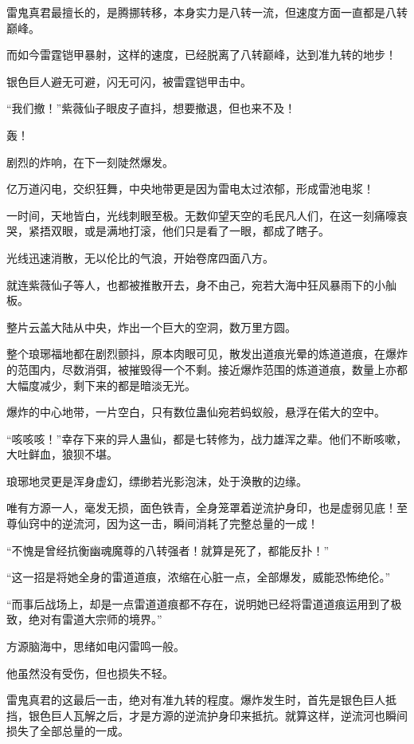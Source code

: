 \begin{this_body}
雷鬼真君最擅长的，是腾挪转移，本身实力是八转一流，但速度方面一直都是八转巅峰。

而如今雷霆铠甲暴射，这样的速度，已经脱离了八转巅峰，达到准九转的地步！

银色巨人避无可避，闪无可闪，被雷霆铠甲击中。

“我们撤！”紫薇仙子眼皮子直抖，想要撤退，但也来不及！

轰！

剧烈的炸响，在下一刻陡然爆发。

亿万道闪电，交织狂舞，中央地带更是因为雷电太过浓郁，形成雷池电浆！

一时间，天地皆白，光线刺眼至极。无数仰望天空的毛民凡人们，在这一刻痛嚎哀哭，紧捂双眼，或是满地打滚，他们只是看了一眼，都成了瞎子。

光线迅速消散，无以伦比的气浪，开始卷席四面八方。

就连紫薇仙子等人，也都被推散开去，身不由己，宛若大海中狂风暴雨下的小舢板。

整片云盖大陆从中央，炸出一个巨大的空洞，数万里方圆。

整个琅琊福地都在剧烈颤抖，原本肉眼可见，散发出道痕光晕的炼道道痕，在爆炸的范围内，尽数消弭，被摧毁得一个不剩。接近爆炸范围的炼道道痕，数量上亦都大幅度减少，剩下来的都是暗淡无光。

爆炸的中心地带，一片空白，只有数位蛊仙宛若蚂蚁般，悬浮在偌大的空中。

“咳咳咳！”幸存下来的异人蛊仙，都是七转修为，战力雄浑之辈。他们不断咳嗽，大吐鲜血，狼狈不堪。

琅琊地灵更是浑身虚幻，缥缈若光影泡沫，处于涣散的边缘。

唯有方源一人，毫发无损，面色铁青，全身笼罩着逆流护身印，也是虚弱见底！至尊仙窍中的逆流河，因为这一击，瞬间消耗了完整总量的一成！

“不愧是曾经抗衡幽魂魔尊的八转强者！就算是死了，都能反扑！”

“这一招是将她全身的雷道道痕，浓缩在心脏一点，全部爆发，威能恐怖绝伦。”

“而事后战场上，却是一点雷道道痕都不存在，说明她已经将雷道道痕运用到了极致，绝对有雷道大宗师的境界。”

方源脑海中，思绪如电闪雷鸣一般。

他虽然没有受伤，但也损失不轻。

雷鬼真君的这最后一击，绝对有准九转的程度。爆炸发生时，首先是银色巨人抵挡，银色巨人瓦解之后，才是方源的逆流护身印来抵抗。就算这样，逆流河也瞬间损失了全部总量的一成。


\end{this_body}

